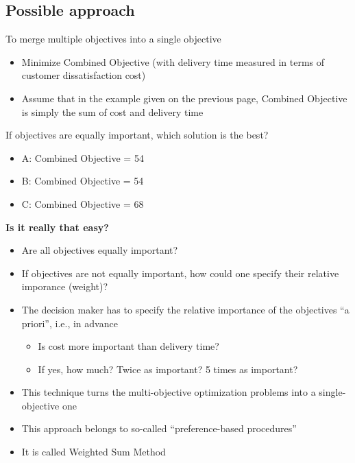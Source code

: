 \documentclass[10pt]{article}
\begin{document}
\subsection{Possible approach}
To merge multiple objectives into a single objective
\begin{itemize}
    \item Minimize Combined Objective (with delivery time measured in terms of customer dissatisfaction cost)
    \item Assume that in the example given on the previous page, Combined Objective is simply the sum of cost and delivery time 
\end{itemize}
If objectives are equally important, which solution is the best?
\begin{itemize}
    \item A: Combined Objective = 54
    \item B: Combined Objective = 54
    \item C: Combined Objective = 68
\end{itemize}
\textbf{Is it really that easy?}
\begin{itemize}
    \item Are all objectives equally important?
    \item If objectives are not equally important, how could one specify their relative imporance (weight)?
    \item The decision maker has to specify the relative importance of the objectives ``a priori'', i.e., in advance
    \begin{itemize}
        \item Is cost more important than delivery time?
        \item If yes, how much? Twice as important? 5 times as important?
    \end{itemize}
    \item This technique turns the multi-objective optimization problems into a single-objective one 
    \item This approach belongs to so-called ``preference-based procedures''
    \item It is called Weighted Sum Method 
\end{itemize}
\end{document}
